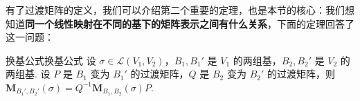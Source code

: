 





有了过渡矩阵的定义，我们可以介绍第二个重要的定理，也是本节的核心：我们想知道\textbf{同一个线性映射在不同的基下的矩阵表示之间有什么关系}，下面的定理回答了这一问题：
\begin{theorem}{换基公式}{换基公式}
    设 $\sigma \in \mathcal{L}(V_1,V_2)$，$B_1,B_1'$ 是 $V_1$ 的两组基，$B_2,B_2'$ 是 $V_2$ 的两组基. 设 $P$ 是 $B_1$ 变为 $B_1'$ 的过渡矩阵，$Q$ 是 $B_2$ 变为 $B_2'$ 的过渡矩阵，则 $\mathbf{M}_{B_1',B_2'}(\sigma) = Q^{-1}\mathbf{M}_{B_1,B_2}(\sigma)P$.
\end{theorem}


